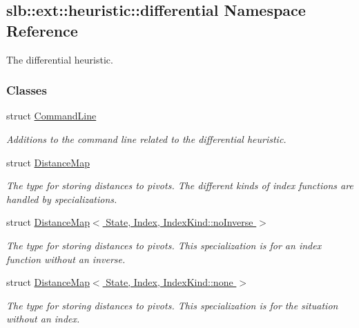 \hypertarget{namespaceslb_1_1ext_1_1heuristic_1_1differential}{}\subsection{slb\+:\+:ext\+:\+:heuristic\+:\+:differential Namespace Reference}
\label{namespaceslb_1_1ext_1_1heuristic_1_1differential}


The differential heuristic.  


\subsubsection*{Classes}
\begin{DoxyCompactItemize}
\item 
struct \hyperlink{structslb_1_1ext_1_1heuristic_1_1differential_1_1CommandLine}{Command\+Line}
\begin{DoxyCompactList}\small\item\em Additions to the command line related to the differential heuristic. \end{DoxyCompactList}\item 
struct \hyperlink{structslb_1_1ext_1_1heuristic_1_1differential_1_1DistanceMap}{Distance\+Map}
\begin{DoxyCompactList}\small\item\em The type for storing distances to pivots. The different kinds of index functions are handled by specializations. \end{DoxyCompactList}\item 
struct \hyperlink{structslb_1_1ext_1_1heuristic_1_1differential_1_1DistanceMap_3_01State_00_01Index_00_01IndexKind_1_1noInverse_01_4}{Distance\+Map$<$ State, Index, Index\+Kind\+::no\+Inverse $>$}
\begin{DoxyCompactList}\small\item\em The type for storing distances to pivots. This specialization is for an index function without an inverse. \end{DoxyCompactList}\item 
struct \hyperlink{structslb_1_1ext_1_1heuristic_1_1differential_1_1DistanceMap_3_01State_00_01Index_00_01IndexKind_1_1none_01_4}{Distance\+Map$<$ State, Index, Index\+Kind\+::none $>$}
\begin{DoxyCompactList}\small\item\em The type for storing distances to pivots. This specialization is for the situation without an index. \end{DoxyCompactList}\item 

\end{DoxyCompactItemize}
